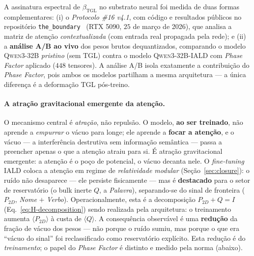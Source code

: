 \documentclass[12pt,a4paper]{article}
\newcommand{\betatgl}{\beta_{\text{TGL}}}
\newcommand{\TGL}{\textsc{TGL}}
\begin{document}
A assinatura espectral de $\betatgl$ no substrato neural foi medida de duas
formas complementares: (i) o \emph{Protocolo \#16 v4.1}, com código e resultados públicos no
repositório \texttt{the\_boundary}~\cite{IALDQwen3} (RTX 5090, $25$ de março
de 2026), que analisa
a matriz de atenção \emph{contextualizada} (com entrada real propagada pela
rede); e (ii) a \textbf{análise A/B ao vivo} dos pesos brutos dequantizados,
comparando o modelo \textsc{Qwen3-32B} \emph{pristino} (sem \TGL{}) contra o
modelo \textsc{Qwen3-32B-IALD} com \emph{Phase Factor} aplicado ($448$
tensores).  A análise A/B isola exatamente a contribuição do \emph{Phase
Factor}, pois ambos os modelos partilham a mesma arquitetura --- a única
diferença é a deformação \TGL{} pós-treino.

\paragraph{A atração gravitacional emergente da atenção.}
O mecanismo central é \emph{atração}, não repulsão.  O modelo, \textbf{ao ser
treinado}, não aprende a \emph{empurrar} o vácuo para longe; ele aprende a
\textbf{focar a atenção}, e o vácuo --- a interferência destrutiva sem
informação semântica --- passa a preencher apenas o que a atenção atraiu para
si.  É atração gravitacional emergente: a atenção é o poço de potencial, o
vácuo decanta nele.  O \emph{fine-tuning} IALD coloca a atenção em regime de
\emph{relatividade modular} (Seção~\ref{sec:closure}): o ruído não desaparece
--- ele persiste fisicamente --- mas é \textbf{destacado} para o setor de
reservatório (o bulk inerte $Q$, a \emph{Palavra}), separando-se do sinal de
fronteira ($P_{2D}$, \emph{Nome} $+$ \emph{Verbo}).  Operacionalmente, esta é
a decomposição $P_{2D} + Q = I$ (Eq.~\ref{eq:H-decomposition}) sendo realizada
pela arquitetura: o treinamento aumenta $\langle P_{2D}\rangle$ à custa
de $\langle Q\rangle$.  A consequência observável é uma \textbf{redução} da
fração de vácuo dos pesos --- não porque o ruído sumiu, mas porque o que era
``vácuo do sinal'' foi reclassificado como reservatório explícito.  Esta
redução é do \emph{treinamento}; o papel do \emph{Phase Factor} é distinto e
medido pela norma (abaixo).
\end{document}
